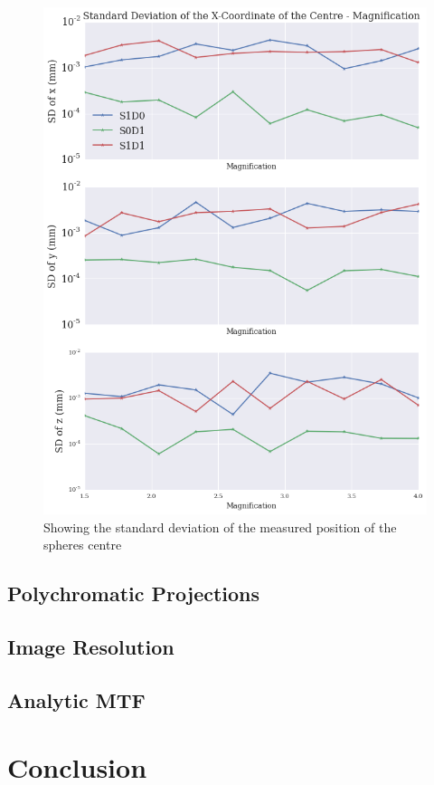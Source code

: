 \documentclass[
  twoside,
  11pt, a4paper,
  footinclude=true,
  headinclude=true,
  cleardoublepage=empty
]{scrbook}
\begin{document}
\begin{figure}[h!]
  \centering
    \includegraphics[width=\textwidth]{figures/output_22_0.png}
    \caption{Showing the standard deviation of the measured position of the spheres centre}
        \label{spherecentrevar}
\end{figure}

\section{Polychromatic Projections}

\section{Image Resolution}

\section{Analytic MTF}


\chapter{Conclusion}
\end{document}
